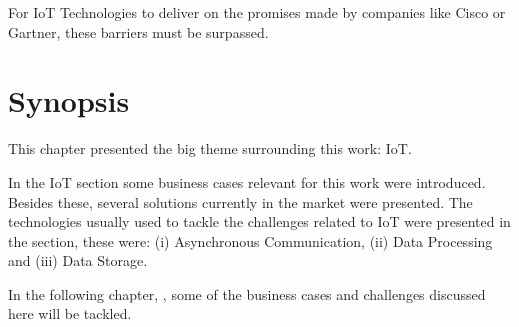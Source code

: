 For \gls{IoT} Technologies to deliver on the promises made by companies like Cisco or Gartner, these barriers must be surpassed.

\section{Synopsis}
\label{sec:stateofart:synopsis}

This chapter presented the big theme surrounding this work: \gls{IoT}.

In the \gls{IoT} section some business cases relevant for this work were introduced. Besides these, several solutions currently in the market were presented.
The technologies usually used to tackle the challenges related to \gls{IoT} were presented in the  section, these were: (i) Asynchronous Communication, (ii) Data Processing and (iii) Data Storage.

In the following chapter, , some of the business cases and challenges discussed here will be tackled.

